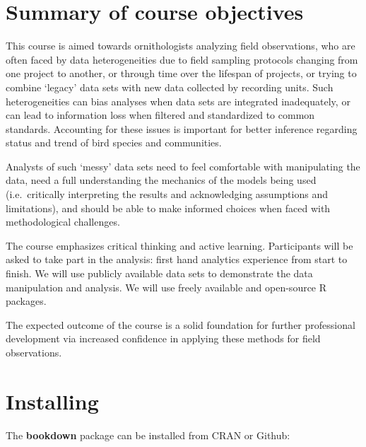 \documentclass[12pt,]{book}
\begin{document}
\hypertarget{summary-of-course-objectives}{%
\section{Summary of course objectives}\label{summary-of-course-objectives}}

This course is aimed towards ornithologists analyzing field observations,
who are often faced by data heterogeneities due to
field sampling protocols changing from one project to another,
or through time over the lifespan of projects, or trying to combine
`legacy' data sets with new data collected by recording units.
Such heterogeneities can bias analyses when data sets are integrated
inadequately, or can lead to information loss when filtered and standardized to
common standards. Accounting for these issues is important for better
inference regarding status and trend of bird species and communities.

Analysts of such `messy' data sets need to feel comfortable
with manipulating the data, need a full understanding the mechanics of the
models being used (i.e.~critically interpreting the results and acknowledging
assumptions and limitations), and should be able to make informed choices when
faced with methodological challenges.

The course emphasizes critical thinking and active learning.
Participants will be asked to take part in the analysis:
first hand analytics experience from start to finish.
We will use publicly available data sets to demonstrate the data manipulation
and analysis. We will use freely available and open-source R packages.

The expected outcome of the course is a solid foundation for further
professional development via increased confidence in applying these methods
for field observations.

\hypertarget{installing}{%
\section{Installing}\label{installing}}

The \textbf{bookdown} package can be installed from CRAN or Github:
\end{document}
